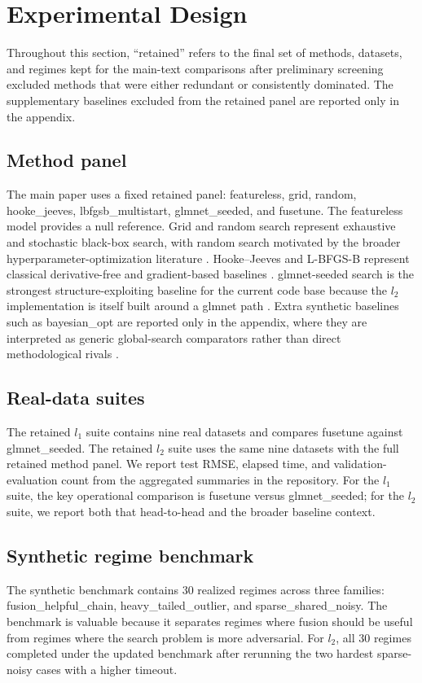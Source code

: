 \documentclass[pdflatex,iicol,sn-mathphys-num]{sn-jnl}
\newcommand{\codeid}{\texttt{fusetune}}
\def\texttt#1{#1}%
\def\codeid{fusetune}%
\def\ell{l}%
\begin{document}
\section{Experimental Design}\label{sec:design}
Throughout this section, ``retained'' refers to the final set of methods, datasets, and regimes kept for the main-text comparisons after preliminary screening excluded methods that were either redundant or consistently dominated. The supplementary baselines excluded from the retained panel are reported only in the appendix.

\subsection{Method panel}
The main paper uses a fixed retained panel: \texttt{featureless}, \texttt{grid}, \texttt{random}, \texttt{hooke\_jeeves}, \texttt{lbfgsb\_multistart}, \texttt{glmnet\_seeded}, and \codeid. The \texttt{featureless} model provides a null reference. Grid and random search represent exhaustive and stochastic black-box search, with random search motivated by the broader hyperparameter-optimization literature \cite{bergstra2012random}. Hooke--Jeeves and L-BFGS-B represent classical derivative-free and gradient-based baselines \cite{hooke1961direct,byrd1995lbfgsb,zhu1997lbfgsb}. \texttt{glmnet}-seeded search is the strongest structure-exploiting baseline for the current code base because the \(\ell_2\) implementation is itself built around a \texttt{glmnet} path \cite{friedman2010glmnet}. Extra synthetic baselines such as \texttt{bayesian\_opt} are reported only in the appendix, where they are interpreted as generic global-search comparators rather than direct methodological rivals \cite{jones1998ego,snoek2012practicalbo}.

\subsection{Real-data suites}
The retained \(\ell_1\) suite contains nine real datasets and compares \codeid{} against \texttt{glmnet\_seeded}. The retained \(\ell_2\) suite uses the same nine datasets with the full retained method panel. We report test RMSE, elapsed time, and validation-evaluation count from the aggregated summaries in the repository. For the \(\ell_1\) suite, the key operational comparison is \codeid{} versus \texttt{glmnet\_seeded}; for the \(\ell_2\) suite, we report both that head-to-head and the broader baseline context.

\subsection{Synthetic regime benchmark}
The synthetic benchmark contains \(30\) realized regimes across three families: \texttt{fusion\_helpful\_chain}, \texttt{heavy\_tailed\_outlier}, and \texttt{sparse\_shared\_noisy}. The benchmark is valuable because it separates regimes where fusion should be useful from regimes where the search problem is more adversarial. For \(\ell_2\), all \(30\) regimes completed under the updated benchmark after rerunning the two hardest sparse-noisy cases with a higher timeout.
\end{document}
